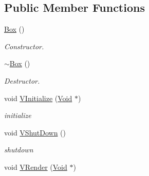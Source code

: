 \subsection*{Public Member Functions}
\begin{DoxyCompactItemize}
\item 
\hypertarget{classContent_1_1Shape_1_1Renderer_1_1Box_a48846a62ee33da5a86501ee90c7c368c}{
\hyperlink{classContent_1_1Shape_1_1Renderer_1_1Box_a48846a62ee33da5a86501ee90c7c368c}{Box} ()}
\label{classContent_1_1Shape_1_1Renderer_1_1Box_a48846a62ee33da5a86501ee90c7c368c}

\begin{DoxyCompactList}\small\item\em Constructor. \item\end{DoxyCompactList}\item 
\hypertarget{classContent_1_1Shape_1_1Renderer_1_1Box_a4f6cf3e90806624a846f6c5d364aa17c}{
\hyperlink{classContent_1_1Shape_1_1Renderer_1_1Box_a4f6cf3e90806624a846f6c5d364aa17c}{$\sim$Box} ()}
\label{classContent_1_1Shape_1_1Renderer_1_1Box_a4f6cf3e90806624a846f6c5d364aa17c}

\begin{DoxyCompactList}\small\item\em Destructor. \item\end{DoxyCompactList}\item 
\hypertarget{classContent_1_1Shape_1_1Renderer_1_1Box_ab100261c5d1f62d765d08f5d7fce11cf}{
void \hyperlink{classContent_1_1Shape_1_1Renderer_1_1Box_ab100261c5d1f62d765d08f5d7fce11cf}{VInitialize} (\hyperlink{structVoid}{Void} $\ast$)}
\label{classContent_1_1Shape_1_1Renderer_1_1Box_ab100261c5d1f62d765d08f5d7fce11cf}

\begin{DoxyCompactList}\small\item\em initialize \item\end{DoxyCompactList}\item 
\hypertarget{classContent_1_1Shape_1_1Renderer_1_1Box_a3f5415f686689fe2d8bf5df34a9f948b}{
void \hyperlink{classContent_1_1Shape_1_1Renderer_1_1Box_a3f5415f686689fe2d8bf5df34a9f948b}{VShutDown} ()}
\label{classContent_1_1Shape_1_1Renderer_1_1Box_a3f5415f686689fe2d8bf5df34a9f948b}

\begin{DoxyCompactList}\small\item\em shutdown \item\end{DoxyCompactList}\item 
\hypertarget{classContent_1_1Shape_1_1Renderer_1_1Box_acbe5ee73a3703795f833a805bfe8ee60}{
void \hyperlink{classContent_1_1Shape_1_1Renderer_1_1Box_acbe5ee73a3703795f833a805bfe8ee60}{VRender} (\hyperlink{structVoid}{Void} $\ast$)}
\label{classContent_1_1Shape_1_1Renderer_1_1Box_acbe5ee73a3703795f833a805bfe8ee60}


\end{DoxyCompactItemize}

